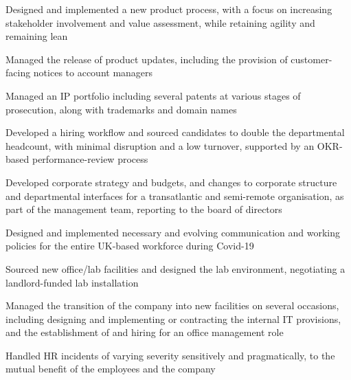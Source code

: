 \begin{cventries}
{      
      \begin{cvitems} %
        \item {Designed and implemented a new product process, with a focus on increasing stakeholder involvement and value assessment, while retaining agility and remaining lean}
        \item {Managed the release of product updates, including the provision of customer-facing notices to account managers}
        \item {Managed an IP portfolio including several patents at various stages of prosecution, along with trademarks and domain names}
      \end{cvitems}
      \begin{cvitems} %
        \item {Developed a hiring workflow and sourced candidates to double the departmental headcount, with minimal disruption and a low turnover, supported by an OKR-based performance-review process}
        \item {Developed corporate strategy and budgets, and changes to corporate structure and departmental interfaces for a transatlantic and semi-remote organisation, as part of the management team, reporting to the board of directors}
        \item {Designed and implemented necessary and evolving communication and working policies for the entire UK-based workforce during Covid-19}
        \item {Sourced new office/lab facilities and designed the lab environment, negotiating a landlord-funded lab installation}
        \item {Managed the transition of the company into new facilities on several occasions, including designing and implementing or contracting the internal IT provisions, and the establishment of and hiring for an office management role}
        \item {Handled HR incidents of varying severity sensitively and pragmatically, to the mutual benefit of the employees and the company}
      \end{cvitems}
    }


\end{cventries}
